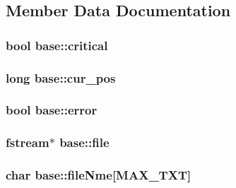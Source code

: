 \subsection{Member Data Documentation}
\hypertarget{classbase_a54337c5388451d2200bfc4129e10114d}{
\subsubsection[{critical}]{\setlength{\rightskip}{0pt plus 5cm}bool {\bf base::critical}}}
\label{classbase_a54337c5388451d2200bfc4129e10114d}
\hypertarget{classbase_a18c8507e30ab4a13349958492f90572e}{
\subsubsection[{cur\_\-pos}]{\setlength{\rightskip}{0pt plus 5cm}long {\bf base::cur\_\-pos}}}
\label{classbase_a18c8507e30ab4a13349958492f90572e}
\hypertarget{classbase_a72b1a293d5b28c566e45317bd28cdf30}{
\subsubsection[{error}]{\setlength{\rightskip}{0pt plus 5cm}bool {\bf base::error}}}
\label{classbase_a72b1a293d5b28c566e45317bd28cdf30}
\hypertarget{classbase_a3af52ee9891719d09b8b19b42450b6f6}{
\subsubsection[{file}]{\setlength{\rightskip}{0pt plus 5cm}fstream$\ast$ {\bf base::file}}}
\label{classbase_a3af52ee9891719d09b8b19b42450b6f6}
\hypertarget{classbase_a350d087127f1d8ba8807eb521b6336fd}{
\subsubsection[{fileNme}]{\setlength{\rightskip}{0pt plus 5cm}char {\bf base::fileNme}\mbox{[}MAX\_\-TXT\mbox{]}}}
